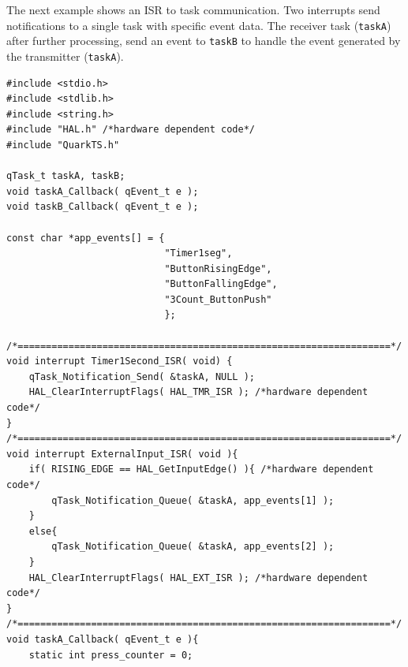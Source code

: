 \documentclass{article}
\begin{document}
The next example shows an ISR to task communication. Two interrupts send notifications to a single task with specific event data. The receiver task (\lstinline{taskA}) after further processing, send an event to \lstinline{taskB} to handle the event generated by the transmitter (\lstinline{taskA}).

\begin{lstlisting}[style=CStyle]
#include <stdio.h>
#include <stdlib.h>
#include <string.h>
#include "HAL.h" /*hardware dependent code*/
#include "QuarkTS.h"

qTask_t taskA, taskB;
void taskA_Callback( qEvent_t e );
void taskB_Callback( qEvent_t e );

const char *app_events[] = {
                            "Timer1seg", 
                            "ButtonRisingEdge", 
                            "ButtonFallingEdge", 
                            "3Count_ButtonPush"
                            };

/*==================================================================*/
void interrupt Timer1Second_ISR( void) {
    qTask_Notification_Send( &taskA, NULL );
    HAL_ClearInterruptFlags( HAL_TMR_ISR ); /*hardware dependent code*/
}
/*==================================================================*/
void interrupt ExternalInput_ISR( void ){
    if( RISING_EDGE == HAL_GetInputEdge() ){ /*hardware dependent code*/
        qTask_Notification_Queue( &taskA, app_events[1] );    
    }
    else{
        qTask_Notification_Queue( &taskA, app_events[2] );
    }
    HAL_ClearInterruptFlags( HAL_EXT_ISR ); /*hardware dependent code*/
}
/*==================================================================*/
void taskA_Callback( qEvent_t e ){
    static int press_counter = 0;
    

\end{lstlisting}
\end{document}
